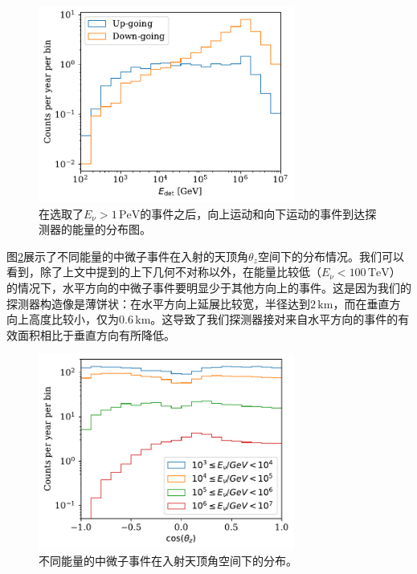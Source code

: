 \begin{figure}[!htb]%
    \centering
    \includegraphics[width=0.75\textwidth]{img/sampling_energy_spectrum_det.pdf}
    \caption{在选取了$E_\nu > 1\,\mathrm{PeV}$的事件之后，向上运动和向下运动的事件到达探测器的能量的分布图。}
    \label{fig:sampling_energy_spectrum_det}
\end{figure}

图\ref{fig:sampling_zenith}展示了不同能量的中微子事件在入射的天顶角$\theta_z$空间下的分布情况。我们可以看到，除了上文中提到的上下几何不对称以外，在能量比较低（$E_\nu < 100\,\mathrm{TeV}$）的情况下，水平方向的中微子事件要明显少于其他方向上的事件。这是因为我们的探测器构造像是薄饼状：在水平方向上延展比较宽，半径达到$2\,\mathrm{km}$，而在垂直方向上高度比较小，仅为$0.6\,\mathrm{km}$。这导致了我们探测器接对来自水平方向的事件的有效面积相比于垂直方向有所降低。

\begin{figure}[!htb]%
    \centering
    \includegraphics[width=0.75\textwidth]{img/sampling_zenith.pdf}
    \caption{不同能量的中微子事件在入射天顶角空间下的分布。}
    \label{fig:sampling_zenith}
\end{figure}

